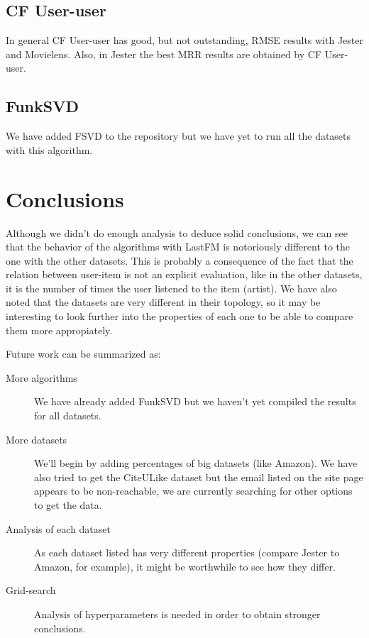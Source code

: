 \documentclass[a4paper]{article}
\begin{document}
\subsection{CF User-user}
In general CF User-user has good, but not outstanding, RMSE results with Jester and Movielens. Also, in Jester the best MRR results are obtained by CF User-user.

\subsection{FunkSVD}
We have added FSVD to the repository but we have yet to run all the datasets with this algorithm.



\section{Conclusions}
Although we didn't do enough analysis to deduce solid conclusions, we can see that the behavior of the algorithms with LastFM is notoriously different to the one with the other datasets. This is probably a consequence of the fact that the relation between user-item is not an explicit evaluation, like in the other datasets, it is the number of times the user listened to the item (artist). We have also noted that the datasets are very different in their topology, so it may be interesting to look further into the properties of each one to be able to compare them more appropiately.

Future work can be summarized as:
\begin{description}
\item[More algorithms] We have already added FunkSVD but we haven't yet compiled the results for all datasets.
\item[More datasets] We'll begin by adding percentages of big datasets (like Amazon). We have also tried to get the CiteULike dataset but the email listed on the site page appears to be non-reachable, we are currently searching for other options to get the data.
\item[Analysis of each dataset] As each dataset listed has very different properties (compare Jester to Amazon, for example), it might be worthwhile to see how they differ.
\item[Grid-search] Analysis of hyperparameters is needed in order to obtain stronger conclusions.
\end{description}
\end{document}

